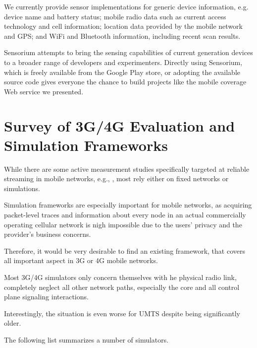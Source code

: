 We currently provide sensor implementations for generic device information, e.g. device name and battery status; mobile radio data such as current access technology and cell information; location data provided by the mobile network and \gls{GPS}; and  WiFi and Bluetooth information, including recent scan results.

Sensorium attempts to bring the sensing capabilities of current generation devices to a broader range of developers and experimenters. Directly using Sensorium, which is freely available from the Google Play store, or adopting the available source code gives everyone the chance to build projects like the mobile coverage Web service we presented.



\section{Survey of 3G/4G Evaluation and Simulation Frameworks}

While there are some active measurement studies specifically targeted at reliable streaming in mobile networks, e.g., \cite{Muller:2012:EDA:2151677.2151686}, most rely either on fixed networks or simulations.


Simulation frameworks are especially important for mobile networks, as acquiring packet-level traces and information about every node in an actual commercially operating cellular network is nigh impossible due to the users' privacy and the provider's business concerns.

Therefore, it would be very desirable to find an existing framework, that covers all important aspect in 3G or 4G mobile networks.

Most 3G/4G simulators only concern themselves with he physical radio link, completely neglect all other network paths, especially the core and all control plane signaling interactions.

Interestingly, the situation is even worse for \gls{UMTS} despite being significantly older.

The following list summarizes a number of simulators.

